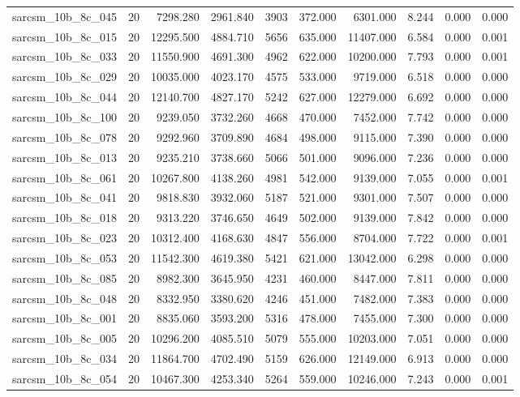 \begin{tabular}{lrrrrrrrrr}
sarcsm\_10b\_8c\_045 & 20 & 7298.280 & 2961.840 & 3903 & 372.000 & 6301.000 & 8.244 & 0.000 & 0.000 \\
sarcsm\_10b\_8c\_015 & 20 & 12295.500 & 4884.710 & 5656 & 635.000 & 11407.000 & 6.584 & 0.000 & 0.001 \\
sarcsm\_10b\_8c\_033 & 20 & 11550.900 & 4691.300 & 4962 & 622.000 & 10200.000 & 7.793 & 0.000 & 0.001 \\
sarcsm\_10b\_8c\_029 & 20 & 10035.000 & 4023.170 & 4575 & 533.000 & 9719.000 & 6.518 & 0.000 & 0.000 \\
sarcsm\_10b\_8c\_044 & 20 & 12140.700 & 4827.170 & 5242 & 627.000 & 12279.000 & 6.692 & 0.000 & 0.000 \\
sarcsm\_10b\_8c\_100 & 20 & 9239.050 & 3732.260 & 4668 & 470.000 & 7452.000 & 7.742 & 0.000 & 0.000 \\
sarcsm\_10b\_8c\_078 & 20 & 9292.960 & 3709.890 & 4684 & 498.000 & 9115.000 & 7.390 & 0.000 & 0.000 \\
sarcsm\_10b\_8c\_013 & 20 & 9235.210 & 3738.660 & 5066 & 501.000 & 9096.000 & 7.236 & 0.000 & 0.000 \\
sarcsm\_10b\_8c\_061 & 20 & 10267.800 & 4138.260 & 4981 & 542.000 & 9139.000 & 7.055 & 0.000 & 0.001 \\
sarcsm\_10b\_8c\_041 & 20 & 9818.830 & 3932.060 & 5187 & 521.000 & 9301.000 & 7.507 & 0.000 & 0.000 \\
sarcsm\_10b\_8c\_018 & 20 & 9313.220 & 3746.650 & 4649 & 502.000 & 9139.000 & 7.842 & 0.000 & 0.000 \\
sarcsm\_10b\_8c\_023 & 20 & 10312.400 & 4168.630 & 4847 & 556.000 & 8704.000 & 7.722 & 0.000 & 0.001 \\
sarcsm\_10b\_8c\_053 & 20 & 11542.300 & 4619.380 & 5421 & 621.000 & 13042.000 & 6.298 & 0.000 & 0.000 \\
sarcsm\_10b\_8c\_085 & 20 & 8982.300 & 3645.950 & 4231 & 460.000 & 8447.000 & 7.811 & 0.000 & 0.000 \\
sarcsm\_10b\_8c\_048 & 20 & 8332.950 & 3380.620 & 4246 & 451.000 & 7482.000 & 7.383 & 0.000 & 0.000 \\
sarcsm\_10b\_8c\_001 & 20 & 8835.060 & 3593.200 & 5316 & 478.000 & 7455.000 & 7.300 & 0.000 & 0.000 \\
sarcsm\_10b\_8c\_005 & 20 & 10296.200 & 4085.510 & 5079 & 555.000 & 10203.000 & 7.051 & 0.000 & 0.000 \\
sarcsm\_10b\_8c\_034 & 20 & 11864.700 & 4702.490 & 5159 & 626.000 & 12149.000 & 6.913 & 0.000 & 0.000 \\
sarcsm\_10b\_8c\_054 & 20 & 10467.300 & 4253.340 & 5264 & 559.000 & 10246.000 & 7.243 & 0.000 & 0.001 \\

\end{tabular}
